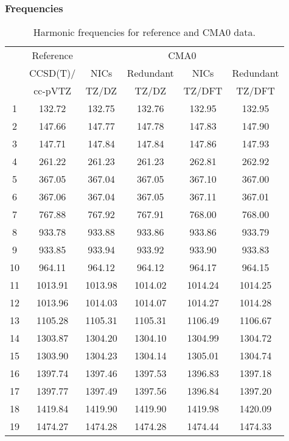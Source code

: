 \documentclass[10pt,oneside]{article}
\begin{document}
\begin{table}[h!]
\subsubsection*{Frequencies}
\centering
\caption{Harmonic frequencies for reference and CMA0 data.}
\begin{tabular}{cccccc}
\toprule
{} & Reference & \multicolumn{4}{c}{CMA0} \\
{} &  CCSD(T)/ &    NICs &  Redundant &    NICs & Redundant \\
{} &   cc-pVTZ &   TZ/DZ &      TZ/DZ &  TZ/DFT &    TZ/DFT \\
\midrule
1  &    132.72 &  132.75 &     132.76 &  132.95 &    132.95 \\
2  &    147.66 &  147.77 &     147.78 &  147.83 &    147.90 \\
3  &    147.71 &  147.84 &     147.84 &  147.86 &    147.93 \\
4  &    261.22 &  261.23 &     261.23 &  262.81 &    262.92 \\
5  &    367.05 &  367.04 &     367.05 &  367.10 &    367.00 \\
6  &    367.06 &  367.04 &     367.05 &  367.11 &    367.01 \\
7  &    767.88 &  767.92 &     767.91 &  768.00 &    768.00 \\
8  &    933.78 &  933.88 &     933.86 &  933.86 &    933.79 \\
9  &    933.85 &  933.94 &     933.92 &  933.90 &    933.83 \\
10 &    964.11 &  964.12 &     964.12 &  964.17 &    964.15 \\
11 &   1013.91 & 1013.98 &    1014.02 & 1014.24 &   1014.25 \\
12 &   1013.96 & 1014.03 &    1014.07 & 1014.27 &   1014.28 \\
13 &   1105.28 & 1105.31 &    1105.31 & 1106.49 &   1106.67 \\
14 &   1303.87 & 1304.20 &    1304.10 & 1304.99 &   1304.72 \\
15 &   1303.90 & 1304.23 &    1304.14 & 1305.01 &   1304.74 \\
16 &   1397.74 & 1397.46 &    1397.53 & 1396.83 &   1397.18 \\
17 &   1397.77 & 1397.49 &    1397.56 & 1396.84 &   1397.20 \\
18 &   1419.84 & 1419.90 &    1419.90 & 1419.98 &   1420.09 \\
19 &   1474.27 & 1474.28 &    1474.28 & 1474.44 &   1474.33 \\

\end{tabular}
\end{table}
\end{document}

